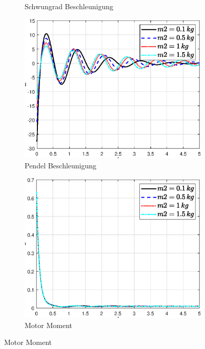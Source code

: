 \begin{figure}
\begin{subfigure}[b]{0.49 \linewidth}
        \caption{Schwungrad Beschleunigung}
        \label{fig:m2_phi_punkt_punkt}
    \end{subfigure}
    \begin{subfigure}[b]{0.49 \linewidth}
        \includegraphics[width=\linewidth]{Bilder/5_sensi/fig/m2/theta_punkt_punkt.eps}
        \caption{Pendel Beschleunigung}
        \label{fig:m2_theta_punkt_punkt}
    \end{subfigure}
    \begin{subfigure}[b]{0.49\linewidth}
        \includegraphics[width=\linewidth]{Bilder/5_sensi/fig/m2/tau.eps}
        \caption{Motor Moment}

\end{subfigure}
\end{figure}
